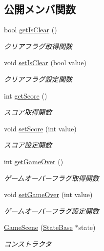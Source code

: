 \subsection*{公開メンバ関数}
\begin{DoxyCompactItemize}
\item 
bool \mbox{\hyperlink{class_game_scene_a56604f01c0fa914660c3d8b788a94405}{get\+Is\+Clear}} ()
\begin{DoxyCompactList}\small\item\em クリアフラグ取得関数 \end{DoxyCompactList}\item 
void \mbox{\hyperlink{class_game_scene_a1bd84ecb8d44bd5e57b4a2d772ef1bf9}{set\+Is\+Clear}} (bool value)
\begin{DoxyCompactList}\small\item\em クリアフラグ設定関数 \end{DoxyCompactList}\item 
int \mbox{\hyperlink{class_game_scene_a16b26b3b8ea91dcaf762292414bf5d6d}{get\+Score}} ()
\begin{DoxyCompactList}\small\item\em スコア取得関数 \end{DoxyCompactList}\item 
void \mbox{\hyperlink{class_game_scene_a853fefbf82ff85b9f34e325108ae7e3b}{set\+Score}} (int value)
\begin{DoxyCompactList}\small\item\em スコア設定関数 \end{DoxyCompactList}\item 
int \mbox{\hyperlink{class_game_scene_a2f8413f473bc9a937fa02bfd4678d61d}{get\+Game\+Over}} ()
\begin{DoxyCompactList}\small\item\em ゲームオーバーフラグ取得関数 \end{DoxyCompactList}\item 
void \mbox{\hyperlink{class_game_scene_abaefc8ae1bd5625d79da25120ef33a8e}{set\+Game\+Over}} (int value)
\begin{DoxyCompactList}\small\item\em ゲームオーバーフラグ設定関数 \end{DoxyCompactList}\item 
\mbox{\hyperlink{class_game_scene_a25e9e82ce85255dac27cd6489751bd40}{Game\+Scene}} (\mbox{\hyperlink{class_scene_base_1_1_state_base}{State\+Base}} $\ast$state)
\begin{DoxyCompactList}\small\item\em コンストラクタ \end{DoxyCompactList}\end{DoxyCompactItemize}
